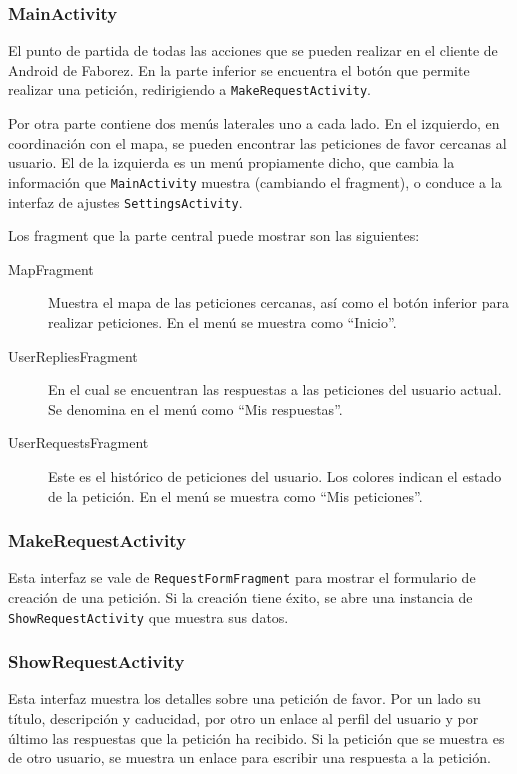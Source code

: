 \documentclass[main]{subfiles}
\begin{document}
\subsubsection{MainActivity}

El punto de partida de todas las acciones que se pueden realizar en el cliente de Android de Faborez. En la parte inferior se encuentra el botón que permite realizar una petición, redirigiendo a \texttt{MakeRequestActivity}.

Por otra parte contiene dos menús laterales uno a cada lado. En el izquierdo, en coordinación con el mapa, se pueden encontrar las peticiones de favor cercanas al usuario. El de la izquierda es un menú propiamente dicho, que cambia la información que \texttt{MainActivity} muestra (cambiando el \gls{fragment}), o conduce a la interfaz de ajustes \texttt{SettingsActivity}.

Los \gls{fragment} que la parte central puede mostrar son las siguientes:

\begin{description}
  \item[MapFragment] Muestra el mapa de las peticiones cercanas, así como el botón inferior para realizar peticiones. En el menú se muestra como \enquote{Inicio}.
  \item[UserRepliesFragment] En el cual se encuentran las respuestas a las peticiones del usuario actual. Se denomina en el menú como \enquote{Mis respuestas}.
  \item[UserRequestsFragment] Este es el histórico de peticiones del usuario. Los colores indican el estado de la petición. En el menú se muestra como \enquote{Mis peticiones}.
\end{description}

\subsubsection{MakeRequestActivity}

Esta interfaz se vale de \texttt{RequestFormFragment} para mostrar el formulario de creación de una petición. Si la creación tiene éxito, se abre una instancia de \texttt{ShowRequestActivity} que muestra sus datos.

\subsubsection{ShowRequestActivity}

Esta interfaz muestra los detalles sobre una petición de favor. Por un lado su título, descripción y caducidad, por otro un enlace al perfil del usuario y por último las respuestas que la petición ha recibido. Si la petición que se muestra es de otro usuario, se muestra un enlace para escribir una respuesta a la petición.
\end{document}
